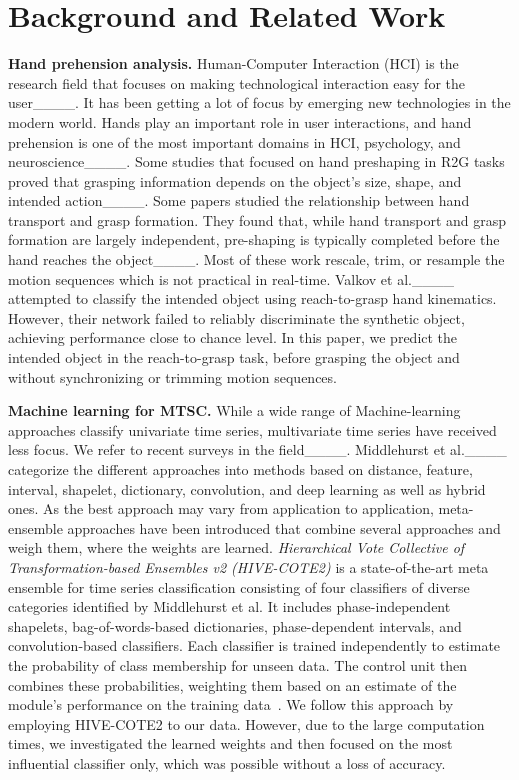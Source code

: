 \section{Background and Related Work}
\label{sec:related}
\textbf{Hand prehension analysis.}
Human-Computer Interaction (HCI) is the research field that focuses on making technological interaction easy for the user____. It has been getting a lot of focus by emerging new technologies in the modern world. Hands play an important role in user interactions, and hand prehension is one of the most important domains in HCI, psychology, and neuroscience____. Some studies that focused on hand preshaping in R2G tasks proved that grasping information depends on the object's size, shape, and intended action____. Some papers studied the relationship between hand transport and grasp formation. They found that, while hand transport and grasp formation are largely independent, pre-shaping is typically completed before the hand reaches the object____. Most of these work rescale, trim, or resample the motion sequences which is not practical in real-time. Valkov et al.____ attempted to classify the intended object using reach-to-grasp hand kinematics. However, their network failed to reliably discriminate the synthetic object, achieving performance close to chance level. In this paper, we predict the intended object in the reach-to-grasp task, before grasping the object and without synchronizing or trimming motion sequences.

\noindent
\textbf{Machine learning for MTSC.}
While a wide range of Machine-learning approaches classify univariate time series, multivariate time series have received less focus. We refer to recent surveys in the field____. Middlehurst et al.____ categorize the different approaches into methods based on distance, feature, interval, shapelet, dictionary, convolution, and deep learning as well as hybrid ones. As the best approach may vary from application to application, meta-ensemble approaches have been introduced that combine several approaches and weigh them, where the weights are learned. \textit{Hierarchical Vote Collective of Transformation-based Ensembles v2 (HIVE-COTE2)} is a state-of-the-art meta ensemble for time series classification consisting of four classifiers of diverse categories identified by Middlehurst et al. It includes phase-independent shapelets, bag-of-words-based dictionaries, phase-dependent intervals, and convolution-based classifiers. Each classifier is trained independently to estimate the probability of class membership for unseen data. The control unit then combines these probabilities, weighting them based on an estimate of the module's performance on the training data~\cite {middlehurst2021hive}. We follow this approach by employing HIVE-COTE2 to our data. However, due to the large computation times, we investigated the learned weights and then focused on the most influential classifier only, which was possible without a loss of accuracy.

